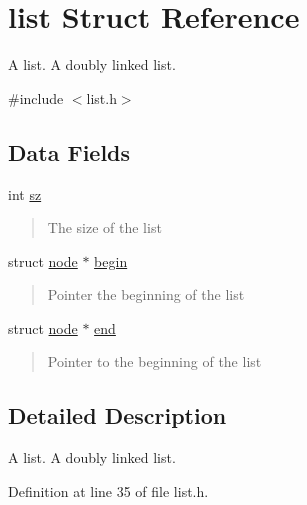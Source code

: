 \hypertarget{structlist}{}\section{list Struct Reference}
\label{structlist}


A list. A doubly linked list.  




{\ttfamily \#include $<$list.\+h$>$}

\subsection*{Data Fields}
\begin{DoxyCompactItemize}
\item 
int \hyperlink{structlist_a0e1ea19fb9fa7881d15d84eff4c090e1}{sz}
\begin{DoxyCompactList}\small\item\em \begin{quote}
The size of the list \end{quote}
\end{DoxyCompactList}\item 
struct \hyperlink{structnode}{node} $\ast$ \hyperlink{structlist_a4608ed60ff5a6f2ada6dc6e4744c299f}{begin}
\begin{DoxyCompactList}\small\item\em \begin{quote}
Pointer the beginning of the list \end{quote}
\end{DoxyCompactList}\item 
struct \hyperlink{structnode}{node} $\ast$ \hyperlink{structlist_a8a6d5d9008d8b6eac4a8edb8fbb1f191}{end}
\begin{DoxyCompactList}\small\item\em \begin{quote}
Pointer to the beginning of the list \end{quote}
\end{DoxyCompactList}\end{DoxyCompactItemize}


\subsection{Detailed Description}
A list. A doubly linked list. 

Definition at line 35 of file list.\+h.



